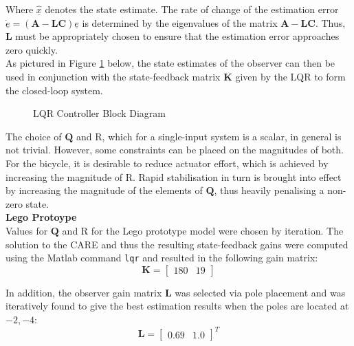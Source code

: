 Where $\underline{\hat{x}}$ denotes the state estimate. The rate of change of the estimation error $\dot{\underline{e}} = (\mathbf{A - \mathbf{L C}}) \underline{e}$ is determined by the eigenvalues of the matrix $\mathbf{A - \mathbf{L C}}$. Thus, $\mathbf{L}$ must be appropriately chosen to ensure that the estimation error approaches zero quickly. \\

As pictured in Figure \ref{fig:LQR} below, the state estimates of the observer can then be used in conjunction with the state-feedback matrix $\mathbf{K}$ given by the LQR to form the closed-loop system. \\

\begin{figure}[H]
	\centering
    \def\svgwidth{0.5\textwidth}
    
    \caption{LQR Controller Block Diagram}
	\label{fig:LQR}
\end{figure}

The choice of $\mathbf{Q}$ and R, which for a single-input system is a scalar, in general is not trivial. However, some constraints can be placed on the magnitudes of both. For the bicycle, it is desirable to reduce actuator effort, which is achieved by increasing the magnitude of R. Rapid stabilisation in turn is brought into effect by increasing the magnitude of the elements of $\mathbf{Q}$, thus heavily penalising a non-zero state. \\

\textbf{Lego Protoype} \\
Values for $\mathbf{Q}$ and R for the Lego prototype model were chosen by iteration. The solution to the CARE and thus the resulting state-feedback gains were computed using the Matlab command \texttt{lqr} and resulted in the following gain matrix:
\begin{equation*}
\mathbf{K} = \begin{bmatrix}
180 & 19
\end{bmatrix}
\end{equation*}

In addition, the observer gain matrix $\mathbf{L}$ was selected via pole placement and was iteratively found to give the best estimation results when the poles are located at $-2,-4$:
\begin{equation*}
\mathbf{L} = \begin{bmatrix}
0.69 & 1.0
\end{bmatrix}^T
\end{equation*}

